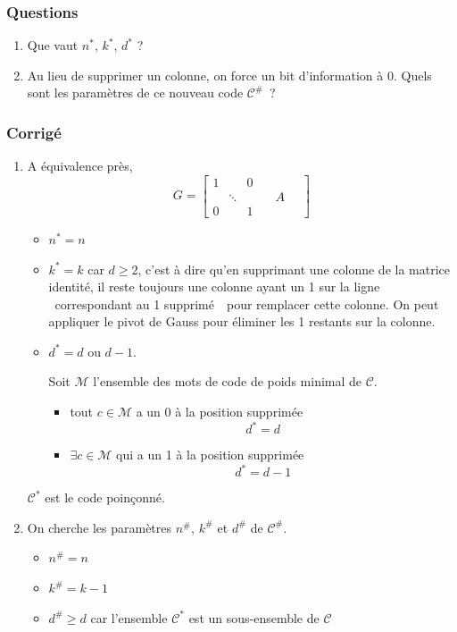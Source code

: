 \documentclass[a4paper,10pt,twocolumn]{article}
\theoremstyle{break}
\newcommand{\code}[1]{\mathcal{#1}}
\newcommand{\C}{\code{C}}
\begin{document}
\subsubsection*{Questions}
\begin{enumerate}
 \item Que vaut $n^*$, $k^*$, $d^*$ ?
 \item Au lieu de supprimer un colonne, on force un bit d'information à 0.
 Quels sont les paramètres de ce nouveau code $\C^\#$~?
\end{enumerate}

\subsubsection*{Corrigé}

\begin{enumerate}
 \item A équivalence près, 
 $$ G = \left[
 \begin{array}{ccc|c}
  1 & & 0 & \\
  & \ddots & & \quad A \quad \\
  0 & & 1 &
 \end{array}\right]$$
 \begin{itemize}
  \item $n^* = n$
  \item $k^* = k$ car $d \ge 2$, c'est à dire qu'en supprimant une colonne de la matrice identité, 
  il reste toujours une colonne ayant un 1 sur la ligne \flqq~correspondant au 1 supprimé~\frqq~pour
  remplacer cette colonne. On peut appliquer le pivot de Gauss pour éliminer les 1 restants
  sur la colonne.
  \item $d^* = d$ ou $d - 1$.

  Soit $\mathcal{M}$ l'ensemble des mots de code de poids minimal de $\C$.
  \begin{itemize}
   \item tout $c \in \mathcal{M}$ a un 0 à la position supprimée $$d^* = d$$
   \item $\exists c \in \mathcal{M}$ qui a un 1 à la position supprimée $$d^* = d-1$$
  \end{itemize}
 \end{itemize}
 $\C^*$ est le code poinçonné.

 \item On cherche les paramètres $n^\#$, $k^\#$ et $d^\#$ de $\C^\#$.
 \begin{itemize}
  \item $n^\# = n$
  \item $k^\# = k-1$
  \item $d^\# \ge d$ car l'ensemble $\C^*$ est un sous-ensemble de $\C$
 \end{itemize}
\end{enumerate}
\end{document}
